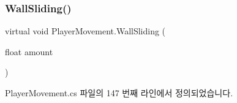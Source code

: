 \mbox{\label{class_player_movement_a9a54ca25bbc57c10ddbd74d4a0b1e30f}} 
\subsubsection{\texorpdfstring{WallSliding()}{WallSliding()}}
{\footnotesize\ttfamily virtual void Player\+Movement.\+Wall\+Sliding (\begin{DoxyParamCaption}\item[{float}]{amount }\end{DoxyParamCaption})\hspace{0.3cm}{\ttfamily [virtual]}}



Player\+Movement.\+cs 파일의 147 번째 라인에서 정의되었습니다.



